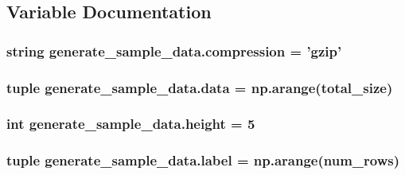 \subsection{Variable Documentation}
\hypertarget{namespacegenerate__sample__data_ae085b150f0489c2f88c614ca8ead3b10}{
\subsubsection[{compression}]{\setlength{\rightskip}{0pt plus 5cm}string generate\+\_\+sample\+\_\+data.\+compression = 'gzip'}}\label{namespacegenerate__sample__data_ae085b150f0489c2f88c614ca8ead3b10}
\hypertarget{namespacegenerate__sample__data_a6d6f72c9c6db3bc85a15a55d7b6a4481}{
\subsubsection[{data}]{\setlength{\rightskip}{0pt plus 5cm}tuple generate\+\_\+sample\+\_\+data.\+data = np.\+arange({\bf total\+\_\+size})}}\label{namespacegenerate__sample__data_a6d6f72c9c6db3bc85a15a55d7b6a4481}
\hypertarget{namespacegenerate__sample__data_aee9f33a4615d33e1df6895e47bcc3eee}{
\subsubsection[{height}]{\setlength{\rightskip}{0pt plus 5cm}int generate\+\_\+sample\+\_\+data.\+height = 5}}\label{namespacegenerate__sample__data_aee9f33a4615d33e1df6895e47bcc3eee}
\hypertarget{namespacegenerate__sample__data_ab3adb52f8cd3ca5ea300de81eec28ff2}{
\subsubsection[{label}]{\setlength{\rightskip}{0pt plus 5cm}tuple generate\+\_\+sample\+\_\+data.\+label = np.\+arange({\bf num\+\_\+rows})}}\label{namespacegenerate__sample__data_ab3adb52f8cd3ca5ea300de81eec28ff2}
